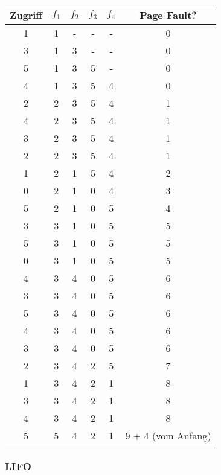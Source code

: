 \documentclass[10pt,a4paper]{article}
\begin{document}
\begin{tabular}{c|c|c|c|c|c}
  Zugriff & $f_{1}$ & $f_{2}$ & $f_{3}$ & $f_{4}$ & Page Fault?\\\hline
  1 & 1 & - & - & - & 0\\
  3 & 1 & 3 & - & - & 0\\
  5 & 1 & 3 & 5 & - & 0\\
  4 & 1 & 3 & 5 & 4 & 0\\
  2 & 2 & 3 & 5 & 4 & 1\\
  4 & 2 & 3 & 5 & 4 & 1\\
  3 & 2 & 3 & 5 & 4 & 1\\
  2 & 2 & 3 & 5 & 4 & 1\\
  1 & 2 & 1 & 5 & 4 & 2\\
  0 & 2 & 1 & 0 & 4 & 3\\
  5 & 2 & 1 & 0 & 5 & 4\\
  3 & 3 & 1 & 0 & 5 & 5\\
  5 & 3 & 1 & 0 & 5 & 5\\
  0 & 3 & 1 & 0 & 5 & 5\\
  4 & 3 & 4 & 0 & 5 & 6\\
  3 & 3 & 4 & 0 & 5 & 6\\
  5 & 3 & 4 & 0 & 5 & 6\\
  4 & 3 & 4 & 0 & 5 & 6\\
  3 & 3 & 4 & 0 & 5 & 6\\
  2 & 3 & 4 & 2 & 5 & 7\\
  1 & 3 & 4 & 2 & 1 & 8\\
  3 & 3 & 4 & 2 & 1 & 8\\
  4 & 3 & 4 & 2 & 1 & 8\\
  5 & 5 & 4 & 2 & 1 & 9 + 4 (vom Anfang)
\end{tabular}

\subsubsection*{LIFO}
\end{document}
